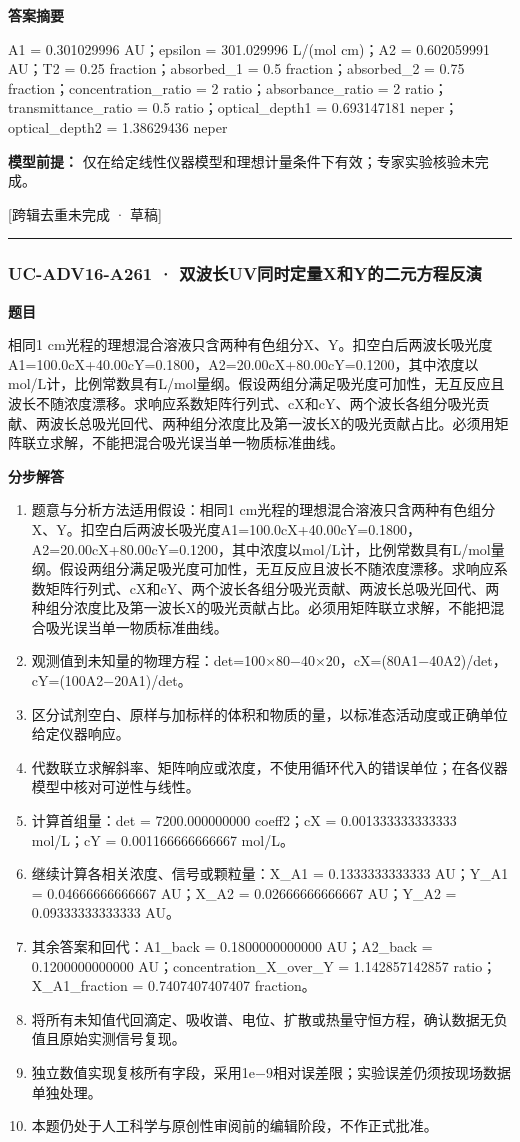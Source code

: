 \documentclass[UTF8,11pt,a4paper]{ctexart}
\begin{document}
\noindent\textbf{答案摘要}\par
A1 = 0.301029996 AU；epsilon = 301.029996 L/(mol cm)；A2 = 0.602059991 AU；T2 = 0.25 fraction；absorbed\_1 = 0.5 fraction；absorbed\_2 = 0.75 fraction；concentration\_ratio = 2 ratio；absorbance\_ratio = 2 ratio；transmittance\_ratio = 0.5 ratio；optical\_depth1 = 0.693147181 neper；optical\_depth2 = 1.38629436 neper\par
\noindent\textbf{模型前提：}
仅在给定线性仪器模型和理想计量条件下有效；专家实验核验未完成。\par
\noindent\textcolor{red!65!black}{[跨辑去重未完成 · 草稿]} \par
\medskip\hrule\medskip
{}
\subsubsection*{UC-ADV16-A261 · 双波长UV同时定量X和Y的二元方程反演}
\noindent\textbf{题目}\par
相同1 cm光程的理想混合溶液只含两种有色组分X、Y。扣空白后两波长吸光度A1=100.0cX+40.00cY=0.1800，A2=20.00cX+80.00cY=0.1200，其中浓度以mol/L计，比例常数具有L/mol量纲。假设两组分满足吸光度可加性，无互反应且波长不随浓度漂移。求响应系数矩阵行列式、cX和cY、两个波长各组分吸光贡献、两波长总吸光回代、两种组分浓度比及第一波长X的吸光贡献占比。必须用矩阵联立求解，不能把混合吸光误当单一物质标准曲线。\par
\medskip\noindent\textbf{分步解答}
\begin{enumerate}
\item 题意与分析方法适用假设：相同1 cm光程的理想混合溶液只含两种有色组分X、Y。扣空白后两波长吸光度A1=100.0cX+40.00cY=0.1800，A2=20.00cX+80.00cY=0.1200，其中浓度以mol/L计，比例常数具有L/mol量纲。假设两组分满足吸光度可加性，无互反应且波长不随浓度漂移。求响应系数矩阵行列式、cX和cY、两个波长各组分吸光贡献、两波长总吸光回代、两种组分浓度比及第一波长X的吸光贡献占比。必须用矩阵联立求解，不能把混合吸光误当单一物质标准曲线。
\item 观测值到未知量的物理方程：det=100×80−40×20，cX=(80A1−40A2)/det，cY=(100A2−20A1)/det。
\item 区分试剂空白、原样与加标样的体积和物质的量，以标准态活动度或正确单位给定仪器响应。
\item 代数联立求解斜率、矩阵响应或浓度，不使用循环代入的错误单位；在各仪器模型中核对可逆性与线性。
\item 计算首组量：det = 7200.000000000 coeff2；cX = 0.001333333333333 mol/L；cY = 0.001166666666667 mol/L。
\item 继续计算各相关浓度、信号或颗粒量：X\_A1 = 0.1333333333333 AU；Y\_A1 = 0.04666666666667 AU；X\_A2 = 0.02666666666667 AU；Y\_A2 = 0.09333333333333 AU。
\item 其余答案和回代：A1\_back = 0.1800000000000 AU；A2\_back = 0.1200000000000 AU；concentration\_X\_over\_Y = 1.142857142857 ratio；X\_A1\_fraction = 0.7407407407407 fraction。
\item 将所有未知值代回滴定、吸收谱、电位、扩散或热量守恒方程，确认数据无负值且原始实测信号复现。
\item 独立数值实现复核所有字段，采用1e−9相对误差限；实验误差仍须按现场数据单独处理。
\item 本题仍处于人工科学与原创性审阅前的编辑阶段，不作正式批准。
\end{enumerate}
\end{document}
